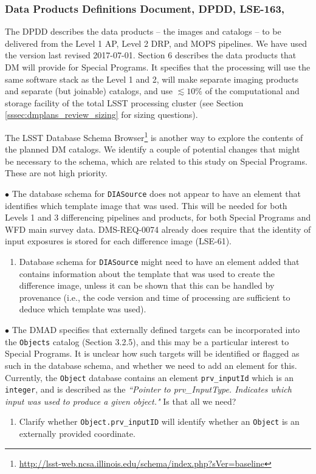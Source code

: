 \documentclass[DM,lsstdraft,toc]{lsstdoc}
\begin{document}
\subsubsection{Data Products Definitions Document, DPDD, LSE-163, \cite{LSE-163}}\label{sssec:dmplans_review_dpdd}

The DPDD describes the data products -- the images and catalogs -- to be delivered from the Level 1 AP, Level 2 DRP, and MOPS pipelines. We have used the version last revised 2017-07-01. Section 6 describes the data products that DM will provide for Special Programs. It specifies that the processing will use the same software stack as the Level 1 and 2, will make separate imaging products and separate (but joinable) catalogs, and use $\lesssim10\%$ of the computational and storage facility of the total LSST processing cluster (see Section \ref{sssec:dmplans_review_sizing} for sizing questions). 

The LSST Database Schema Browser\footnote{\url{http://lsst-web.ncsa.illinois.edu/schema/index.php?sVer=baseline}} is another way to explore the contents of the planned DM catalogs. We identify a couple of potential changes that might be necessary to the schema, which are related to this study on Special Programs. These are not high priority.

$\bullet$ The database schema for {\tt DIASource} does not appear to have an element that identifies which template image that was used. This will be needed for both Levels 1 and 3 differencing pipelines and products, for both Special Programs and WFD main survey data. DMS-REQ-0074 already does require that the identity of input exposures is stored for each difference image (LSE-61).
\begin{enumerate}[resume,topsep=-10pt,label= \textbf{Concern \Roman*.}] \item \label{C8} Database schema for {\tt DIASource} might need to have an element added that contains information about the template that was used to create the difference image, unless it can be shown that this can be handled by provenance (i.e., the code version and time of processing are sufficient to deduce which template was used). \end{enumerate}

$\bullet$ The DMAD specifies that externally defined targets can be incorporated into the {\tt Objects} catalog (Section 3.2.5), and this may be a particular interest to Special Programs. It is unclear how such targets will be identified or flagged as such in the database schema, and whether we need to add an element for this. Currently, the {\tt Object} database contains an element {\tt prv\_inputId} which is an {\tt integer}, and is described as the {\it ``Pointer to prv\_InputType. Indicates which input was used to produce a given object."} Is that all we need? \\
\begin{enumerate}[resume,topsep=-10pt,label= \textbf{Concern \Roman*.}] \item \label{C9} Clarify whether {\tt Object.prv\_inputID} will identify whether an {\tt Object} is an externally provided coordinate. \end{enumerate}
\end{document}
